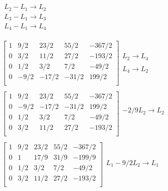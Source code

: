 \documentclass[]{article}
\begin{document}
\[\begin{array}{l}
\begin{array}{l}
\\ 
 L_{2} -  L_{1} \rightarrow L_{2} \\ 
 L_{3} -  L_{1} \rightarrow L_{3} \\ 
 L_{4} -  L_{1} \rightarrow L_{4} \\ 
\end{array}\\
 \\
\left[
\begin{array}{rrrr|r}
1 & 9/2 & 23/2 & 55/2 & -367/2 \\ 
0 & 3/2 & 11/2 & 27/2 & -193/2 \\ 
0 & 1/2 & 3/2 & 7/2 & -49/2 \\ 
0 & -9/2 & -17/2 & -31/2 & 199/2 \\ 
\end{array}
\right]\begin{array}{l}
\\ 
L_{2} \rightarrow L_{4}\\ 
\\ 
L_{4} \rightarrow L_{2}\\ 
\end{array}\\
 \\
\left[
\begin{array}{rrrr|r}
1 & 9/2 & 23/2 & 55/2 & -367/2 \\ 
0 & -9/2 & -17/2 & -31/2 & 199/2 \\ 
0 & 1/2 & 3/2 & 7/2 & -49/2 \\ 
0 & 3/2 & 11/2 & 27/2 & -193/2 \\ 
\end{array}
\right]\begin{array}{l}
\\ 
-2/9 L_{2} \rightarrow L_{2}\\ 
\\ 
\\ 
\end{array}\\
 \\
\left[
\begin{array}{rrrr|r}
1 & 9/2 & 23/2 & 55/2 & -367/2 \\ 
0 & 1 & 17/9 & 31/9 & -199/9 \\ 
0 & 1/2 & 3/2 & 7/2 & -49/2 \\ 
0 & 3/2 & 11/2 & 27/2 & -193/2 \\ 
\end{array}
\right]\begin{array}{l}
 L_{1} - 9/2 L_{2} \rightarrow L_{1} \\ 

\end{array}
\end{array}\]
\end{document}
